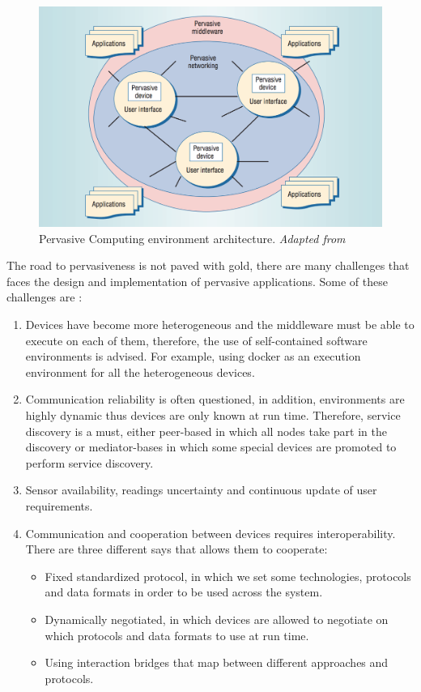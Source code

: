 \begin{figure}[H]
	\centering
	\includegraphics[scale=0.7]{images/pervasive-computing.png}
	\caption{Pervasive Computing environment architecture. \textit{Adapted from \cite{Saha:2003:PCP:642243.642248}}}
 	\label{fig:pervaisive-computing}
\end{figure}

\noindent The road to pervasiveness is not paved with gold, there are many challenges that faces the design and implementation of pervasive applications. Some of these challenges are \cite{Schiele2010}:
\begin{enumerate}
\item Devices have become more heterogeneous and the middleware must be able to execute on each of them, therefore, the use of self-contained software environments is advised. For example, using docker as an execution environment for all the heterogeneous devices.
\item Communication reliability is often questioned, in addition,  environments are highly dynamic thus devices are only known at run time.   Therefore, service discovery is a must, either peer-based in which all nodes  take part in the discovery or mediator-bases in which some special devices are promoted to perform service discovery.
\item Sensor availability, readings uncertainty and continuous update of user requirements.
\item Communication and cooperation between devices requires interoperability. There are three different says that allows them to cooperate:

\begin{itemize}
\item Fixed standardized protocol, in which we set some technologies, protocols and data formats in order to be used across the system.
\item Dynamically negotiated, in which devices are allowed to negotiate on which protocols and data formats to use  at run time.
\item Using interaction bridges that map between different approaches and protocols.
\end{itemize}

\end{enumerate} 



